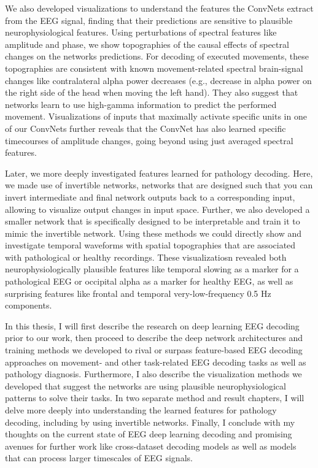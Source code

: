 We also developed visualizations to understand the features the ConvNets
extract from the EEG signal, finding that their predictions are
sensitive to plausible neurophysiological features. Using perturbations
of spectral features like amplitude and phase, we show topographies of
the causal effects of spectral changes on the networks predictions. For
decoding of executed movements, these topographies are consistent with
known movement-related spectral brain-signal changes like contralateral
alpha power decreases (e.g., decrease in alpha power on the right side
of the head when moving the left hand). They also suggest that networks
learn to use high-gamma information to predict the performed movement.
Visualizations of inputs that maximally activate specific units in one
of our ConvNets further reveals that the ConvNet has also learned
specific timecourses of amplitude changes, going beyond using just
averaged spectral features.

Later, we more deeply investigated features learned for pathology
decoding. Here, we made use of invertible networks, networks that are
designed such that you can invert intermediate and final network outputs
back to a corresponding input, allowing to visualize output changes in
input space. Further, we also developed a smaller network that is
specifically designed to be interpretable and train it to mimic the
invertible network. Using these methods we could directly show and
investigate temporal waveforms with spatial topographies that are
associated with pathological or healthy recordings. These visualizatiosn
revealed both neurophysiologically plausible features like temporal
slowing as a marker for a pathological EEG or occipital alpha as a
marker for healthy EEG, as well as surprising features like frontal and
temporal very-low-frequency 0.5 Hz components.

    In this thesis, I will first describe the research on deep learning EEG
decoding prior to our work, then proceed to describe the deep network
architectures and training methods we developed to rival or surpass
feature-based EEG decoding approaches on movement- and other
task-related EEG decoding tasks as well as pathology diagnosis.
Furthermore, I also describe the visualization methods we developed that
suggest the networks are using plausible neurophysiological patterns to
solve their tasks. In two separate method and result chapters, I will
delve more deeply into understanding the learned features for pathology
decoding, including by using invertible networks. Finally, I conclude
with my thoughts on the current state of EEG deep learning decoding and
promising avenues for further work like cross-dataset decoding models as
well as models that can process larger timescales of EEG signals.

